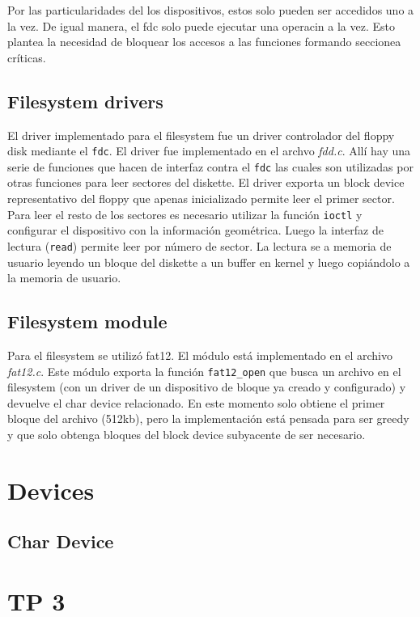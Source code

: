 \documentclass[a4paper]{article}
\newcommand{\file}[1]{\textit{#1}}
\newcommand{\func}[1]{\lstinline{#1}}
\begin{document}
Por las particularidades del los dispositivos, estos solo pueden ser accedidos uno a la vez. De igual manera, el fdc solo puede ejecutar una operacin a la vez. Esto plantea la necesidad de bloquear los accesos a las funciones formando seccionea críticas. 

\subsection{Filesystem drivers}
El driver implementado para el filesystem fue un driver controlador del floppy disk mediante el \func{fdc}. El driver fue implementado en el archvo \file{fdd.c}. Allí hay una serie de funciones que hacen de interfaz contra el \func{fdc} las cuales son utilizadas por otras funciones para leer sectores del diskette. El driver exporta un block device representativo del floppy que apenas inicializado permite leer el primer sector. Para leer el resto de los sectores es necesario utilizar la función \func{ioctl} y configurar el dispositivo con la información geométrica. Luego la interfaz de lectura (\func{read}) permite leer por número de sector. La lectura se a memoria de usuario leyendo un bloque del diskette a un buffer en kernel y luego copiándolo a la memoria de usuario. 

\subsection{Filesystem module}
Para el filesystem se utilizó fat12. El módulo está implementado en el archivo \file{fat12.c}. Este módulo exporta la función \func{fat12_open} que busca un archivo en el filesystem (con un driver de un dispositivo de bloque ya creado y configurado) y devuelve el char device relacionado. En este momento solo obtiene el primer bloque del archivo (512kb), pero la implementación está pensada para ser greedy y que solo obtenga bloques del block device subyacente de ser necesario. 

\section{Devices}

\subsection{Char Device}



\section{TP 3 }
\end{document}
